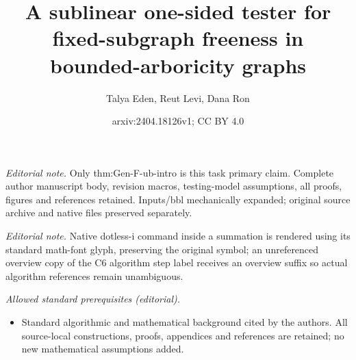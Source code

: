 \documentclass{article}
\title{A sublinear one-sided tester for fixed-subgraph freeness in bounded-arboricity graphs}
\author{Talya Eden, Reut Levi, Dana Ron}
\date{arxiv:2404.18126v1; CC BY 4.0}
\begin{document}
\maketitle
\noindent\textit{Editorial note.} Only thm:Gen-F-ub-intro is this task primary claim. Complete author manuscript body, revision macros, testing-model assumptions, all proofs, figures and references retained. Inputs/bbl mechanically expanded; original source archive and native files preserved separately.\par\medskip
\noindent\textit{Editorial note.} Native dotless-i command inside a summation is rendered using its standard math-font glyph, preserving the original symbol; an unreferenced overview copy of the C6 algorithm step label receives an overview suffix so actual algorithm references remain unambiguous.\par\medskip
\noindent\textit{Allowed standard prerequisites (editorial).}\begin{itemize}
\item Standard algorithmic and mathematical background cited by the authors. All source-local constructions, proofs, appendices and references are retained; no new mathematical assumptions added.
\end{itemize}\medskip



\date{}
			
				
\end{document}
